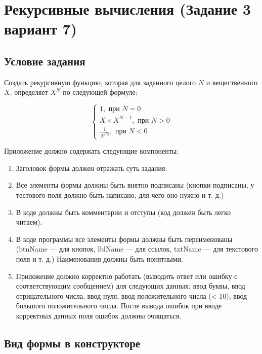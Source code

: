 \section{Рекурсивные вычисления (Задание 3 вариант 7)}

\subsection{Условие задания}

Создать рекурсивную функцию, которая для заданного целого $N$ и вещественного $X$, определяет $X^N$ по следующей формуле:\cite{cite4}

\begin{equation*}
    \begin{cases}
        1, \text{ при } N = 0 \\ 
        X \times X^{N - 1}, \text{ при } N > 0 \\ 
        \frac{1}{X^{|N|}}, \text{ при } N < 0
    \end{cases}
\end{equation*}


Приложение должно содержать следующие компоненты:

\begin{enumerate}
    \item{Заголовок формы должен отражать суть задания.}
    \item{Все элементы формы должны быть внятно подписаны (кнопки подписаны, у тестового поля должно быть написано, для чего оно нужно и т. д.)}
    \item{В коде должны быть комментарии и отступы (код должен быть легко читаем).}
    \item{В коде программы все элементы формы должны быть переименованы (btnName ---  для кнопок, lblName --- для ссылок, txtName --- для текстового поля и т. д.) Наименования должны быть понятными.}
    \item{Приложение должно корректно работать (выводить ответ или ошибку с соответствующим сообщением) для следующих данных: ввод буквы, ввод отрицательного числа, ввод нуля, ввод положительного числа (< 10), ввод большого положительного числа. После вывода ошибок при вводе корректных данных поля ошибок должны очищаться.}
\end{enumerate}

\subsection{Вид формы в конструкторе}

